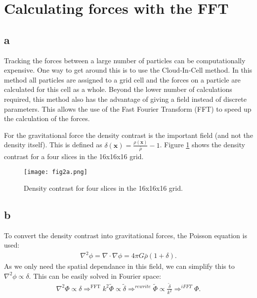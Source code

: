 \section{Calculating forces with the FFT}



\subsection*{a}
Tracking the forces between a large number of particles can be computationally expensive.
One way to get around this is to use the Cloud-In-Cell method.
In this method all particles are assigned to a grid cell and the forces on a particle are calculated for this cell as a whole.
Beyond the lower number of calculations required, this method also has the advantage of giving a field instead of discrete parameters.
This allows the use of the Fast Fourier Transform (FFT) to speed up the calculation of the forces.

For the gravitational force the density contrast is the important field (and not the density itself).
This is defined as $\delta(\mathbf{x}) = \frac{\rho(\mathbf{x})}{\bar{\rho}} - 1$.
Figure \ref{fig:density_contrast} shows the density contrast for a four slices in the 16x16x16 grid.
\begin{figure}
    \centering
    \texttt{[image: fig2a.png]}
    \caption{Density contrast for four slices in the 16x16x16 grid.}
    \label{fig:density_contrast}
\end{figure}





\subsection*{b}
To convert the density contrast into gravitational forces, the Poisson equation is used:
\begin{align}
    \nabla^2 \phi = \nabla \cdot \nabla \phi = 4 \pi G \bar{\rho} (1 + \delta).
\end{align}
As we only need the spatial dependance in this field, we can simplify this to $\nabla^2 \phi \propto \delta$.
This can be easily solved in Fourier space:
\begin{align}
    \nabla^2 \Phi \propto \delta \Rightarrow^{\text{FFT}} k^2 \tilde{\Phi} \propto \tilde{\delta} \Rightarrow^{rewrite} \tilde{\Phi} \propto \frac{\tilde{\delta}}{k^2}
    \Rightarrow^{iFFT} \Phi.    
\end{align}

